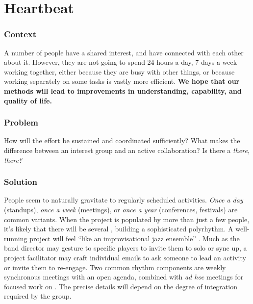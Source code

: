 \section{Heartbeat}\label{sec:Heartbeat}

\subsubsection*{Context}
A number of people have a shared interest, and have connected with each other about it.  However, they are not going to spend 24 hours a day, 7 days a week working together, either because they are busy with other things, or because working separately on some tasks is vastly more efficient.
\textbf{We hope that our methods will lead to improvements in understanding, capability, and quality of life.}

\subsubsection*{Problem} How will the effort be sustained and coordinated sufficiently?  What makes the difference between an interest group and an active collaboration?  Is there a \emph{there, there?}

\subsubsection*{Solution} People seem to naturally gravitate to regularly scheduled activities.  \emph{Once a day} (standups), \emph{once a week} (meetings), or \emph{once a year} (conferences, festivals) are common variants.  When the project is populated by more than just a few people, it's likely that there will be several , building a sophisticated polyrhythm.  A well-running project will feel ``like an improvisational jazz ensemble'' \cite{david2001software}.  Much as the band director may gesture to specific players to invite them to solo or sync up, a project facilitator may craft individual emails to ask someone to lead an activity or invite them to re-engage.  Two common rhythm components are weekly synchronous meetings with an open agenda, combined with \emph{ad hoc} meetings for focused work on .  The precise details will depend on the degree of integration required by the group.

